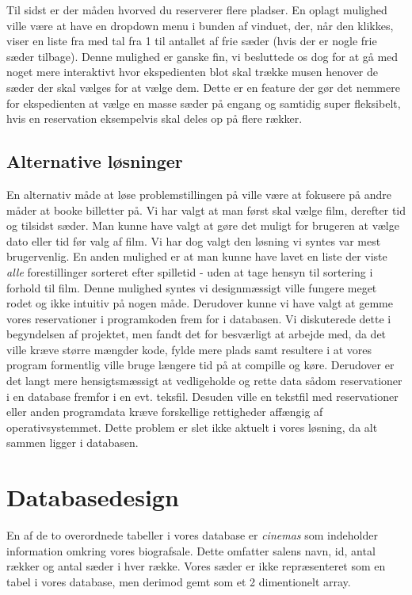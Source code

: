 \documentclass[final]{report}
\begin{document}
Til sidst er der måden hvorved du reserverer flere pladser. En oplagt mulighed ville være at have en dropdown menu i bunden af vinduet, der, når den klikkes, viser en liste fra med tal fra 1 til antallet af frie sæder (hvis der er nogle frie sæder tilbage). Denne mulighed er ganske fin, vi besluttede os dog for at gå med noget mere interaktivt hvor ekspedienten blot skal trække musen henover de sæder der skal vælges for at vælge dem. Dette er en feature der gør det nemmere for ekspedienten at vælge en masse sæder på engang og samtidig super fleksibelt, hvis en reservation eksempelvis skal deles op på flere rækker. 

\subsection{Alternative løsninger}
En alternativ måde at løse problemstillingen på ville være at fokusere på andre måder at booke billetter på. Vi har valgt at man først skal vælge film, derefter tid og tilsidst sæder. Man kunne have valgt at gøre det muligt for brugeren at vælge dato eller tid før valg af film. Vi har dog valgt den løsning vi syntes var mest brugervenlig. En anden mulighed er at man kunne have lavet en liste der viste \emph{alle} forestillinger sorteret efter spilletid - uden at tage hensyn til sortering i forhold til film. Denne mulighed syntes vi designmæssigt ville fungere meget rodet og ikke intuitiv på nogen måde. Derudover kunne vi have valgt at gemme vores reservationer i programkoden frem for i databasen. Vi diskuterede dette i begyndelsen af projektet, men fandt det for besværligt at arbejde med, da det ville kræve større mængder kode, fylde mere plads samt resultere i at vores program formentlig ville bruge længere tid på at compille og køre. Derudover er det langt mere hensigtsmæssigt at vedligeholde og rette data sådom reservationer i en database fremfor i en evt. teksfil. Desuden ville en tekstfil med reservationer eller anden programdata kræve forskellige rettigheder affængig af operativsystemmet. Dette problem er slet ikke aktuelt i vores løsning, da alt sammen ligger i databasen. 

\section{Databasedesign}
En af de to overordnede tabeller i vores database er \emph{cinemas} som indeholder information omkring vores biografsale. Dette omfatter salens navn, id, antal rækker og antal sæder i hver række. Vores sæder er ikke repræsenteret som en tabel i vores database, men derimod gemt som et 2 dimentionelt array. 
\end{document}
